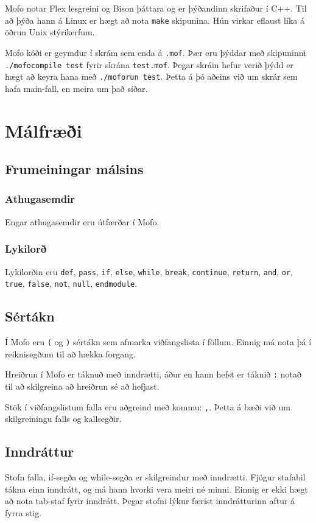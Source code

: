 \documentclass[12pt,a4paper]{article}
\begin{document}
Mofo notar Flex lesgreini og Bison þáttara og er þýðandinn skrifaður í C++. Til að þýða hann á Linux er hægt að nota {\tt make} skipunina.
Hún virkar eflaust líka á öðrun Unix stýrikerfum.

Mofo kóði er geymdur í skrám sem enda á {\tt .mof}. Þær eru þýddar með skipuninni {\tt ./mofocompile test} fyrir skrána {\tt test.mof}.
Þegar skráin hefur verið þýdd er hægt að keyra hana með {\tt ./moforun test}. Þetta á þó aðeins við um skrár sem hafa main-fall, en meira um það síðar.
\pagebreak

\section{Málfræði}
\subsection{Frumeiningar málsins}
\subsubsection{Athugasemdir}
Engar athugasemdir eru útfærðar í Mofo.

\subsubsection{Lykilorð}
Lykilorðin eru {\tt def}, {\tt pass}, {\tt if}, {\tt else}, {\tt while}, {\tt break}, {\tt continue}, {\tt return}, {\tt and}, {\tt or}, {\tt true}, {\tt false}, {\tt not}, {\tt null}, {\tt endmodule}.

\subsection{Sértákn}
Í Mofo eru {\tt (} og {\tt )} sértákn sem afmarka viðfangslista í föllum. Einnig má nota þá í reiknisegðum til að hækka forgang.

Hreiðrun í Mofo er táknuð með inndrætti, áður en hann hefst er táknið {\tt :} notað til að skilgreina að hreiðrun sé að hefjast.

Stök í viðfangslistum falla eru aðgreind með kommu: {\tt ,}. Þetta á bæði við um skilgreiningu falls og kallsegðir.

\subsection{Inndráttur}
Stofn falla, if-segða og while-segða er skilgreindur með inndrætti. Fjögur stafabil tákna einn inndrátt, og má hann hvorki vera meiri né minni. Einnig er
ekki hægt að nota tab-staf fyrir inndrátt. Þegar stofni lýkur færist inndrátturinn aftur á fyrra stig.
\end{document}
